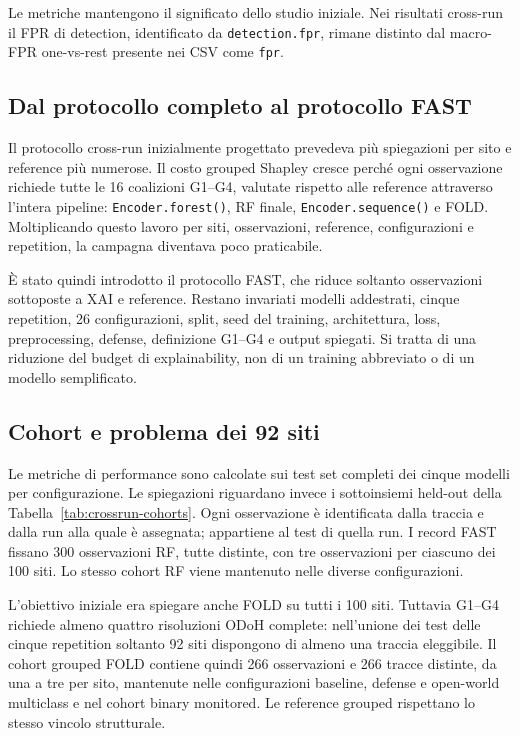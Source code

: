 \documentclass[11pt,a4paper]{article}
\begin{document}
Le metriche mantengono il significato dello studio iniziale. Nei risultati cross-run il FPR di detection, identificato da \texttt{detection.fpr}, rimane distinto dal macro-FPR one-vs-rest presente nei CSV come \texttt{fpr}.

\subsection{Dal protocollo completo al protocollo FAST}
Il protocollo cross-run inizialmente progettato prevedeva più spiegazioni per sito e reference più numerose. Il costo grouped Shapley cresce perché ogni osservazione richiede tutte le 16 coalizioni G1--G4, valutate rispetto alle reference attraverso l'intera pipeline: \texttt{Encoder.forest()}, RF finale, \texttt{Encoder.sequence()} e FOLD. Moltiplicando questo lavoro per siti, osservazioni, reference, configurazioni e repetition, la campagna diventava poco praticabile.

È stato quindi introdotto il protocollo FAST, che riduce soltanto osservazioni sottoposte a XAI e reference. Restano invariati modelli addestrati, cinque repetition, 26 configurazioni, split, seed del training, architettura, loss, preprocessing, defense, definizione G1--G4 e output spiegati. Si tratta di una riduzione del budget di explainability, non di un training abbreviato o di un modello semplificato.

\subsection{Cohort e problema dei 92 siti}
Le metriche di performance sono calcolate sui test set completi dei cinque modelli per configurazione. Le spiegazioni riguardano invece i sottoinsiemi held-out della Tabella~\ref{tab:crossrun-cohorts}. Ogni osservazione è identificata dalla traccia e dalla run alla quale è assegnata; appartiene al test di quella run. I record FAST fissano 300 osservazioni RF, tutte distinte, con tre osservazioni per ciascuno dei 100 siti. Lo stesso cohort RF viene mantenuto nelle diverse configurazioni.

L'obiettivo iniziale era spiegare anche FOLD su tutti i 100 siti. Tuttavia G1--G4 richiede almeno quattro risoluzioni ODoH complete: nell'unione dei test delle cinque repetition soltanto 92 siti dispongono di almeno una traccia eleggibile. Il cohort grouped FOLD contiene quindi 266 osservazioni e 266 tracce distinte, da una a tre per sito, mantenute nelle configurazioni baseline, defense e open-world multiclass e nel cohort binary monitored. Le reference grouped rispettano lo stesso vincolo strutturale.
\end{document}

